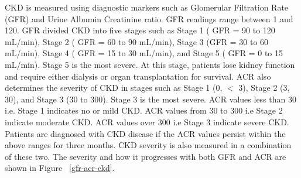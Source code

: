 \flushleft \justifying CKD is measured using diagnostic markers such as Glomerular Filtration Rate (GFR) and Urine Albumin Creatinine ratio. GFR readings range between 1 and 120. GFR divided CKD into five stages such as Stage 1 ( GFR = 90 to 120 mL/min), Stage 2 ( GFR = 60 to 90 mL/min), Stage 3 (GFR = 30 to 60 mL/min), Stage 4 ( GFR = 15 to 30 mL/min), and Stage 5 ( GFR = 0 to 15 mL/min). Stage 5 is the most severe. At this stage, patients lose kidney function and require either dialysis or organ transplantation for survival. ACR also determines the severity of CKD in stages such as Stage 1 (0, $<$ 3), Stage 2 (3, 30), and Stage 3 (30 to 300). Stage 3 is the most severe. ACR values less than 30 i.e. Stage 1 indicates no or mild CKD. ACR values from 30 to 300 i.e Stage 2 indicate moderate CKD. ACR values over 300 i.e Stage 3 indicate severe CKD. Patients are diagnosed with CKD disease if the ACR values persist within the above ranges for three months. CKD severity is also measured in a combination of these two. The severity and how it progresses with both GFR and ACR are shown in Figure ~\ref{gfr-acr-ckd}.

